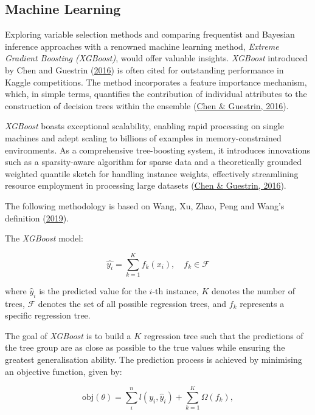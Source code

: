 \documentclass[
  11pt,
]{article}
\begin{document}
\subsection{Machine Learning}

Exploring variable selection methods and comparing frequentist and
Bayesian inference approaches with a renowned machine learning method,
\emph{Extreme Gradient Boosting (XGBoost)}, would offer valuable
insights. \emph{XGBoost} introduced by Chen and Guestrin
(\protect\hyperlink{ref-Chen2016}{2016}) is often cited for outstanding
performance in Kaggle competitions. The method incorporates a feature
importance mechanism, which, in simple terms, quantifies the
contribution of individual attributes to the construction of decision
trees within the ensemble (\protect\hyperlink{ref-Chen2016}{Chen \&
Guestrin, 2016}).

\emph{XGBoost} boasts exceptional scalability, enabling rapid processing
on single machines and adept scaling to billions of examples in
memory-constrained environments. As a comprehensive tree-boosting
system, it introduces innovations such as a sparsity-aware algorithm for
sparse data and a theoretically grounded weighted quantile sketch for
handling instance weights, effectively streamlining resource employment
in processing large datasets (\protect\hyperlink{ref-Chen2016}{Chen \&
Guestrin, 2016}).

The following methodology is based on Wang, Xu, Zhao, Peng and Wang's
definition (\protect\hyperlink{ref-Wang2019}{2019}).

The \emph{XGBoost} model:

\begin{equation}
\hat{y_i} = \sum_{k=1}^{K} f_k(x_i), \quad f_k \in \mathcal{F}
\end{equation}

where \(\hat{y}_i\) is the predicted value for the \(i\)-th instance,
\(K\) denotes the number of trees, \(\mathcal{F}\) denotes the set of
all possible regression trees, and \(f_k\) represents a specific
regression tree.

The goal of \emph{XGBoost} is to build a \(K\) regression tree such that
the predictions of the tree group are as close as possible to the true
values while ensuring the greatest generalisation ability. The
prediction process is achieved by minimising an objective function,
given by:

\begin{equation}
\text{obj}(\theta) = \sum_{i}^{n} l(y_i, \hat{y}_i) + \sum_{k=1}^{K} \Omega(f_k),
\end{equation}
\end{document}
